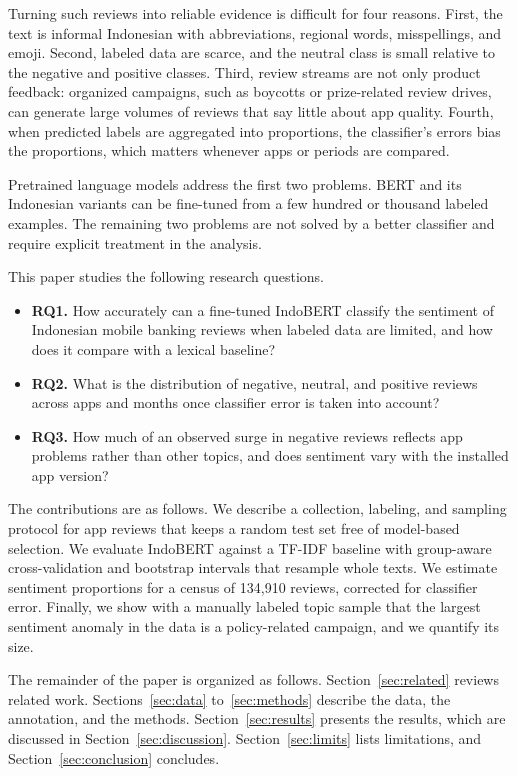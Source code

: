 \documentclass[conference]{IEEEtran}
\begin{document}
Turning such reviews into reliable evidence is difficult for four reasons. First, the text is informal Indonesian with abbreviations, regional words, misspellings, and emoji. Second, labeled data are scarce, and the neutral class is small relative to the negative and positive classes. Third, review streams are not only product feedback: organized campaigns, such as boycotts or prize-related review drives, can generate large volumes of reviews that say little about app quality. Fourth, when predicted labels are aggregated into proportions, the classifier's errors bias the proportions, which matters whenever apps or periods are compared.

Pretrained language models address the first two problems. BERT \cite{b3} and its Indonesian variants \cite{b4} can be fine-tuned from a few hundred or thousand labeled examples. The remaining two problems are not solved by a better classifier and require explicit treatment in the analysis.

This paper studies the following research questions.
\begin{itemize}
\item \textbf{RQ1.} How accurately can a fine-tuned IndoBERT classify the sentiment of Indonesian mobile banking reviews when labeled data are limited, and how does it compare with a lexical baseline?
\item \textbf{RQ2.} What is the distribution of negative, neutral, and positive reviews across apps and months once classifier error is taken into account?
\item \textbf{RQ3.} How much of an observed surge in negative reviews reflects app problems rather than other topics, and does sentiment vary with the installed app version?
\end{itemize}

The contributions are as follows. We describe a collection, labeling, and sampling protocol for app reviews that keeps a random test set free of model-based selection. We evaluate IndoBERT against a TF-IDF baseline with group-aware cross-validation and bootstrap intervals that resample whole texts. We estimate sentiment proportions for a census of 134,910 reviews, corrected for classifier error. Finally, we show with a manually labeled topic sample that the largest sentiment anomaly in the data is a policy-related campaign, and we quantify its size.

The remainder of the paper is organized as follows. Section~\ref{sec:related} reviews related work. Sections~\ref{sec:data} to~\ref{sec:methods} describe the data, the annotation, and the methods. Section~\ref{sec:results} presents the results, which are discussed in Section~\ref{sec:discussion}. Section~\ref{sec:limits} lists limitations, and Section~\ref{sec:conclusion} concludes.
\end{document}
